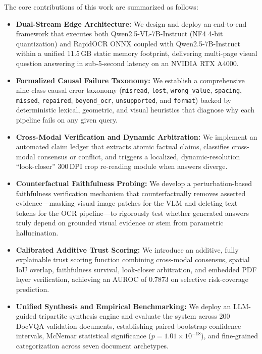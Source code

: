 \documentclass[conference]{IEEEtran}
\begin{document}
The core contributions of this work are summarized as follows:
\begin{itemize}
    \item \textbf{Dual-Stream Edge Architecture:} We design and deploy an end-to-end framework that executes both Qwen2.5-VL-7B-Instruct (NF4 4-bit quantization) and RapidOCR ONNX coupled with Qwen2.5-7B-Instruct within a unified 11.5\,GB static memory footprint, delivering multi-page visual question answering in sub-5-second latency on an NVIDIA RTX A4000.
    \item \textbf{Formalized Causal Failure Taxonomy:} We establish a comprehensive nine-class causal error taxonomy (\texttt{misread}, \texttt{lost}, \texttt{wrong\_value}, \texttt{spacing}, \texttt{missed}, \texttt{repaired}, \texttt{beyond\_ocr}, \texttt{unsupported}, and \texttt{format}) backed by deterministic lexical, geometric, and visual heuristics that diagnose why each pipeline fails on any given query.
    \item \textbf{Cross-Modal Verification and Dynamic Arbitration:} We implement an automated claim ledger that extracts atomic factual claims, classifies cross-modal consensus or conflict, and triggers a localized, dynamic-resolution ``look-closer'' 300\,DPI crop re-reading module when answers diverge.
    \item \textbf{Counterfactual Faithfulness Probing:} We develop a perturbation-based faithfulness verification mechanism that counterfactually removes asserted evidence---masking visual image patches for the VLM and deleting text tokens for the OCR pipeline---to rigorously test whether generated answers truly depend on grounded visual evidence or stem from parametric hallucination.
    \item \textbf{Calibrated Additive Trust Scoring:} We introduce an additive, fully explainable trust scoring function combining cross-modal consensus, spatial IoU overlap, faithfulness survival, look-closer arbitration, and embedded PDF layer verification, achieving an AUROC of $0.7873$ on selective risk-coverage prediction.
    \item \textbf{Unified Synthesis and Empirical Benchmarking:} We deploy an LLM-guided tripartite synthesis engine and evaluate the system across 200 DocVQA validation documents, establishing paired bootstrap confidence intervals, McNemar statistical significance ($p = 1.01 \times 10^{-18}$), and fine-grained categorization across seven document archetypes.
\end{itemize}
\end{document}
